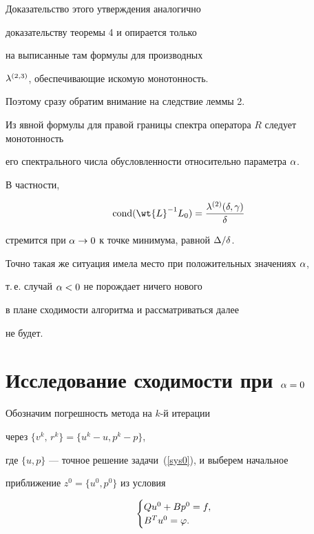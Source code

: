 Доказательство этого утверждения аналогично


доказательству теоремы 4 и опирается только


на выписанные там формулы для производных


$\lambda^{(2,3)}$, обеспечивающие искомую монотонность.





Поэтому сразу обратим внимание на следствие леммы 2.


Из явной формулы для правой границы спектра оператора $R$ следует монотонность


его спектрального числа обусловленности относительно параметра $\alpha$.


В частности,


$$


\cond(\wt{L}^{-1} L_0) =


\dfrac{\zl^{(2)}(\zd,\zg)}{\zd}


$$


стремится при $\alpha \rightarrow 0$ к точке минимума, равной $\Delta/\delta$.


Точно такая же ситуация имела место при положительных значениях $\alpha$,


т.\,е. случай $\alpha < 0 $ не порождает ничего нового


в плане сходимости алгоритма и рассматриваться далее


не будет.








\section{Исследование сходимости при $\alpha=0$}





Обозначим погрешность метода на $k$-й итерации


через $\{v^k,\,r^k\} = \{u^k-u,p^k-p\}$,


где $\{u,p\}$ --- точное решение задачи~(\ref{sys0}), и выберем начальное


приближение $z^0=\{u^0, p^0\}$ из условия


\begin{equation}


\label{nach}


\begin{cases}


Q u^0 + Bp^0 =f,\\


B^Tu^0 = \zp.


\end{cases}


\end{equation}





